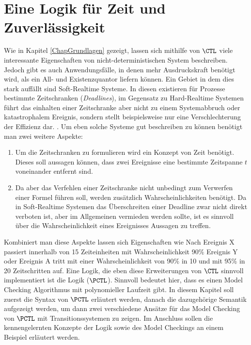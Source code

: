 \section{Eine Logik für Zeit und Zuverlässigkeit}
\label{ChapSyntaxSemantik}


Wie in Kapitel \ref{ChapGrundlagen} gezeigt, lassen sich mithilfe von $\CTL$ viele interessante Eigenschaften von nicht-deterministischen System beschreiben. 
Jedoch gibt es auch Anwendungsfälle, in denen mehr Ausdruckskraft benötigt wird, als ein All- und Existenzquantor liefern können.
Ein Gebiet in dem dies stark auffällt sind Soft-Realtime Systeme. 
In diesen existieren für Prozesse bestimmte Zeitschranken (\textit{Deadlines}), im Gegensatz zu Hard-Realtime Systemen führt das einhalten einer Zeitschranke aber nicht zu einem Systemabbruch oder katastrophalem Ereignis, sondern stellt beispielsweise nur eine Verschlechterung der Effizienz dar. \cite{hansson1994logic}.
Um eben solche Systeme gut beschreiben zu können benötigt man zwei weitere Aspekte:
\begin{enumerate}
	\item Um die Zeitschranken zu formulieren wird ein Konzept von Zeit benötigt. Dieses soll aussagen können, dass zwei Ereignisse eine bestimmte Zeitspanne $t$ voneinander entfernt sind.
	\item Da aber das Verfehlen einer Zeitschranke nicht unbedingt zum Verwerfen einer Formel führen soll, werden zusätzlich Wahrscheinlichkeiten benötigt. 
	Da in Soft-Realtime Systemen das Überschreiten einer Deadline zwar nicht direkt verboten ist, aber im Allgemeinen vermieden werden sollte, ist es sinnvoll über die Wahrscheinlichkeit eines Ereignisses Aussagen zu treffen.
\end{enumerate}
Kombiniert man diese Aspekte lassen sich Eigenschaften wie \glqq Nach Ereignis X passiert innerhalb von 15 Zeiteinheiten mit Wahrscheinlichkeit 90\% Ereignis Y\grqq{} oder \glqq Ereignis A tritt mit einer Wahrscheinlichkeit von 90\% in 10 und mit 95\% in 20 Zeitschritten auf\grqq. 
Eine Logik, die eben diese Erweiterungen von $\CTL$ sinnvoll implementiert ist die Logik  ($\PCTL$). 
Sinnvoll bedeutet hier, dass es einen Model Checking Algorithmus mit polynomieller Laufzeit gibt. 
In diesem Kapitel soll zuerst die Syntax von $\PCTL$ erläutert werden, danach die dazugehörige Semantik aufgezeigt werden, um dann zwei verschiedene Ansätze für das Model Checking von $\PCTL$ mit Transitionssystemen zu zeigen. 
Im Anschluss sollen die kennengelernten Konzepte der Logik sowie des Model Checkings an einem Beispiel erläutert werden.

